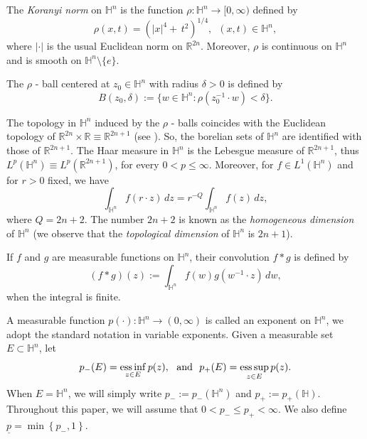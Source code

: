 \documentclass[oneside,10pt]{article}
\newcommand\esssup{\mathop{\rm ess \, sup}}
\newcommand\essinf{\mathop{\rm ess \, inf}}
\begin{document}
The {\it Koranyi norm} on $\mathbb{H}^{n}$ is the function $\rho : \mathbb{H}^{n} \to [0, \infty)$ defined by
\begin{equation} \label{Koranyi norm}
\rho(x,t) = \left( |x|^{4} + \, t^{2}  \right)^{1/4}, \,\,\, (x,t) \in \mathbb{H}^{n},
\end{equation}
where $| \cdot |$ is the usual Euclidean norm on $\mathbb{R}^{2n}$. Moreover, $\rho$ is continuous on $\mathbb{H}^{n}$ and is smooth on 
$\mathbb{H}^{n} \setminus \{ e \}$. 

The $\rho$ - ball centered at $z_0 \in \mathbb{H}^{n}$ with radius $\delta > 0$ is defined by
\[
B(z_0, \delta) := \{ w \in \mathbb{H}^{n} : \rho(z_0^{-1} \cdot w) < \delta \}.
\]

The topology in $\mathbb{H}^{n}$ induced by the $\rho$ - balls coincides with the Euclidean topology of 
$\mathbb{R}^{2n} \times \mathbb{R} \equiv\mathbb{R}^{2n+1}$ (see \cite[Proposition 3.1.37]{Fischer}). So, the borelian sets of 
$\mathbb{H}^{n}$ are identified with those of $\mathbb{R}^{2n+1}$. The Haar measure in $\mathbb{H}^{n}$ is the Lebesgue measure of 
$\mathbb{R}^{2n+1}$, thus $L^{p}(\mathbb{H}^{n}) \equiv L^{p}(\mathbb{R}^{2n+1})$, for every $0 < p \leq \infty$. Moreover, for 
$f \in L^{1}(\mathbb{H}^{n})$ and for $r > 0$ fixed, we have
\begin{equation} \label{homog dim}
\int_{\mathbb{H}^{n}} f(r \cdot z) \, dz = r^{-Q} \int_{\mathbb{H}^{n}} f(z) \, dz,
\end{equation}
where $Q= 2n+2$. The number $2n+2$ is known as the {\it homogeneous dimension} of $\mathbb{H}^{n}$ (we observe that the {\it topological dimension} of $\mathbb{H}^{n}$ is $2n+1$).

If $f$ and $g$ are measurable functions on $\mathbb{H}^{n}$, their convolution $f \ast g$ is defined by
\[
(f \ast g)(z) := \int_{\mathbb{H}^{n}} f(w) g(w^{-1} \cdot z) \, dw,
\]
when the integral is finite.

A measurable function $p(\cdot) : \mathbb{H}^{n} \rightarrow (0, \infty)$ is called an exponent on $\mathbb{H}^n$, we adopt the standard notation in variable exponents. Given a measurable set $E \subset \mathbb{H}^{n}$, let
\[
p_{-}(E) = \essinf_{ z \in E } p(z), \,\,\,\, \text{and} \,\,\,\, p_{+}(E) = \esssup_{z \in E} p(z).
\]
When $E = \mathbb{H}^{n}$, we will simply write $p_{-} := p_{-}(\mathbb{H}^{n})$ and $p_{+} := p_{+}(\mathbb{H})$.
Throughout this paper, we will assume that $0 < p_{-} \leq p_{+} < \infty$. We also define $\underline{p}=\min \left\{ p_{-},1\right\}$.
\end{document}
